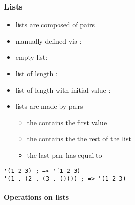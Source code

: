 \documentclass[a4paper,landscape,10pt]{article}
\begin{document}
\begin{multicols*}{2}
  \breakcolumn

  \subsubsection{Lists}

  \begin{itemize}
    \item lists are composed of pairs
    \item manually defined via : 
    \item empty list: 
    \item list of length : 
    \item list of length  with initial value : 
    \item lists are made by pairs
          \begin{itemize} \item the  contains the first value
            \item the  contains the the rest of the list
            \item the last pair has  equal to 
          \end{itemize}
  \end{itemize}

  \begin{lstlisting}[language=Racket]
'(1 2 3) ; => '(1 2 3)
'(1 . (2 . (3 . ()))) ; => '(1 2 3)
\end{lstlisting}

  \paragraph{Operations on lists}


\end{multicols*}
\end{document}
